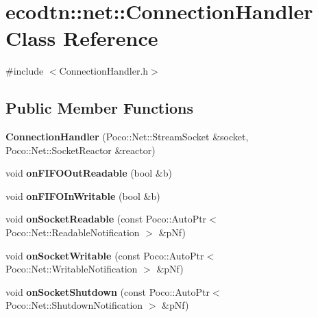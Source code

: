 \hypertarget{classecodtn_1_1net_1_1ConnectionHandler}{}\section{ecodtn\+:\+:net\+:\+:Connection\+Handler Class Reference}
\label{classecodtn_1_1net_1_1ConnectionHandler}


{\ttfamily \#include $<$Connection\+Handler.\+h$>$}

\subsection*{Public Member Functions}
\begin{DoxyCompactItemize}
\item 
\mbox{\label{classecodtn_1_1net_1_1ConnectionHandler_a7d641a5d3e910829a73b52a6cd673581}} 
{\bfseries Connection\+Handler} (Poco\+::\+Net\+::\+Stream\+Socket \&socket, Poco\+::\+Net\+::\+Socket\+Reactor \&reactor)
\item 
\mbox{\label{classecodtn_1_1net_1_1ConnectionHandler_acc1d8cea5d182f88d5582f9067d2ec56}} 
void {\bfseries on\+F\+I\+F\+O\+Out\+Readable} (bool \&b)
\item 
\mbox{\label{classecodtn_1_1net_1_1ConnectionHandler_a41bdb6e4ddf0bcc542fb104e40a99fdc}} 
void {\bfseries on\+F\+I\+F\+O\+In\+Writable} (bool \&b)
\item 
\mbox{\label{classecodtn_1_1net_1_1ConnectionHandler_a3aeb5e1a1e517e1ba390deb01d99f552}} 
void {\bfseries on\+Socket\+Readable} (const Poco\+::\+Auto\+Ptr$<$ Poco\+::\+Net\+::\+Readable\+Notification $>$ \&p\+Nf)
\item 
\mbox{\label{classecodtn_1_1net_1_1ConnectionHandler_a4c70d922ccfee97e01c1b97f6ba545b8}} 
void {\bfseries on\+Socket\+Writable} (const Poco\+::\+Auto\+Ptr$<$ Poco\+::\+Net\+::\+Writable\+Notification $>$ \&p\+Nf)
\item 
\mbox{\label{classecodtn_1_1net_1_1ConnectionHandler_ab168c7adc40e4320105c360cf31c10d0}} 
void {\bfseries on\+Socket\+Shutdown} (const Poco\+::\+Auto\+Ptr$<$ Poco\+::\+Net\+::\+Shutdown\+Notification $>$ \&p\+Nf)
\end{DoxyCompactItemize}


